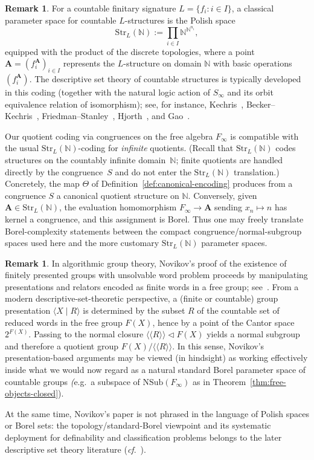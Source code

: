 \documentclass[12pt,fleqn,a4paper]{amsart}
\numberwithin{equation}{section}
\theoremstyle{definition}
\newtheorem{remark}[theorem]{Remark}
\newcommand{\N}{\mathbb{N}}
\newcommand{\NSub}{\mathrm{NSub}}
\begin{document}
\begin{remark}
\label{rem:standard-countable-coding}
For a countable finitary signature $L=\{f_i:i\in I\}$, a classical parameter space for
countable $L$-structures is the Polish space
\[
\mathrm{Str}_L(\N):=\prod_{i\in I}\N^{\N^{n_i}},
\]
equipped with the product of the discrete topologies, where a point
$\mathbf A=(f_i^{\mathbf A})_{i\in I}$ represents the $L$-structure on domain $\N$ with
basic operations $(f_i^{\mathbf A})$.
The descriptive set theory of countable structures is typically developed in this
coding (together with the natural logic action of $S_\infty$ and its orbit equivalence
relation of isomorphism); see, for instance,
Kechris~\cite{Kechris}, Becker--Kechris~\cite{BeckerKechris},
Friedman--Stanley~\cite{FriedmanStanley}, Hjorth~\cite{Hjorth}, and Gao~\cite{GaoDST}.

Our quotient coding via congruences on the free algebra $F_\infty$ is compatible with
the usual $\mathrm{Str}_L(\N)$-coding for \emph{infinite} quotients.
(Recall that $\mathrm{Str}_L(\N)$ codes structures on the countably infinite domain~$\N$;
finite quotients are handled directly by the congruence~$S$ and do not enter the
$\mathrm{Str}_L(\N)$ translation.)
Concretely, the map $\Theta$ of Definition~\ref{def:canonical-encoding} produces from
a congruence $S$ a canonical quotient structure on $\N$.
Conversely, given $\mathbf A\in\mathrm{Str}_L(\N)$, the evaluation homomorphism
$F_\infty\to \mathbf A$ sending $x_n\mapsto n$ has kernel a congruence, and this
assignment is Borel.
Thus one may freely translate Borel-complexity statements between the compact
congruence/normal-subgroup spaces used here and the more customary
$\mathrm{Str}_L(\N)$ parameter spaces.
\end{remark}

\begin{remark}\label{rem:novikov-coding}
In algorithmic group theory, Novikov's proof of the existence of finitely presented
groups with unsolvable word problem proceeds by manipulating presentations and relators
encoded as finite words in a free group; see~\cite{Novikov1955}.
From a modern descriptive-set-theoretic perspective, a (finite or countable) group
presentation $\langle X\mid R\rangle$ is determined by the subset $R$ of the countable
set of reduced words in the free group $F(X)$, hence by a point of the Cantor space
$2^{F(X)}$.
Passing to the normal closure $\langle\!\langle R\rangle\!\rangle\triangleleft F(X)$
yields a normal subgroup and therefore a quotient group
$F(X)/\langle\!\langle R\rangle\!\rangle$.
In this sense, Novikov's presentation-based arguments may be viewed (in hindsight) as
working effectively inside what we would now regard as a natural standard Borel
parameter space of countable groups \emph({e.g.}\ a subspace of $\NSub(F_\infty)$ as in
Theorem~\ref{thm:free-objects-closed}).

At the same time, Novikov's paper is not phrased in the language of Polish spaces or
Borel sets: the topology/standard-Borel viewpoint and its systematic deployment for
definability and classification problems belongs to the later descriptive set theory
literature (\emph{cf}.\ \cite{Kechris,BeckerKechris,Hjorth,GaoDST}).
\end{remark}
\end{document}
